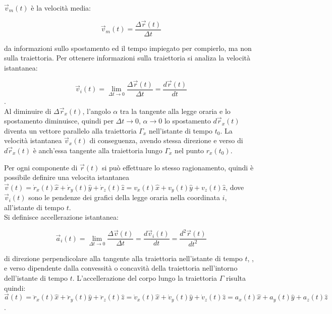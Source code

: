 \documentclass{article}
\numberwithin{equation}{subsection}
\begin{document}
$\vec{v}_m(t)$ è la velocità media: 

\begin{equation}
    \vec{v}_m(t) = \displaystyle\frac{\Delta\vec{r}(t)}{\Delta t}
\end{equation}

da informazioni sullo spostamento ed il 
tempo impiegato per compierlo, ma non sulla traiettoria.
Per ottenere informazioni sulla traiettoria si analiza la velocità istantanea:

\begin{equation}
    \vec{v}_i(t) = \lim_{\Delta t \to 0} \displaystyle\frac{\Delta\vec{r}(t)}{\Delta t} = \displaystyle\frac{d\vec{r}(t)}{dt}
\end{equation}.\\

Al diminuire di $\Delta\vec{r}_x(t)$, l'angolo $\alpha$ tra la tangente alla 
legge oraria e lo spostamento diminuisce, quindi per $\Delta t \to 0$, $\alpha \to 0$ 
lo spostamento $d\vec{r}_x(t)$ diventa un 
vettore parallelo alla traiettoria $\Gamma_x$ nell'istante di 
tempo $t_0$. La velocità istantanea $\vec{v}_x(t)$ di conseguenza, avendo 
stessa direzione e verso di $d\vec{r}_x(t)$ è anch'essa tangente alla traiettoria 
lungo $\Gamma_x$ nel punto $r_x(t_0)$.

Per ogni componente di $\vec{r}(t)$ 
si può effettuare lo stesso ragionamento, 
quindi è possibile definire una velocita istantanea $\vec{v}(t) =
\dot{r}_x(t)\hat{x} +\dot{r}_y(t)\hat{y} +\dot{r}_z(t)\hat{z} = v_x(t)\hat{x} + 
v_y(t)\hat{y} + v_z(t)\hat{z}$, dove $\vec{v}_i(t)$ 
sono le pendenze dei grafici della legge oraria nella coordinata $i$, all'istante 
di tempo $t$.\\

Si definisce accellerazione istantanea: 

\begin{equation}
    \vec{a}_i(t) = \lim_{\Delta t \to 0}\displaystyle\frac{\Delta\vec{v}(t)}{\Delta t} = \displaystyle\frac{d\vec{v}_i(t)}{dt} = \displaystyle\frac{d^{2}\vec{r}(t)}{dt^{2}}
\end{equation}

di direzione perpendicolare alla tangente alla 
traiettoria nell'istante di tempo $t$,
, e verso dipendente dalla convessità o concavità della traiettoria
nell'intorno dell'istante di tempo $t$.
L'accellerazione del corpo lungo la traiettoria $\Gamma$ risulta quindi:
$\vec{a}(t) = \ddot{r}_x(t)\hat{x} +\ddot{r}_y(t)\hat{y} +\ddot{r}_z(t)\hat{z} = \dot{v}_x(t)\hat{x} + 
\dot{v}_y(t)\hat{y} + \dot{v}_z(t)\hat{z} = a_x(t)\hat{x} +a_y(t)\hat{y} + a_z(t)\hat{z}$.
\end{document}
